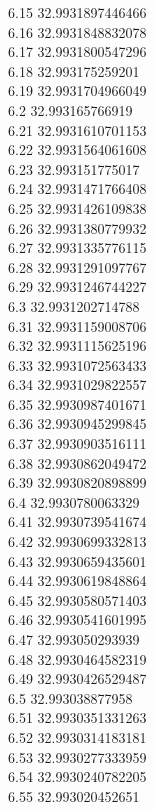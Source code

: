 {6.15	32.9931897446466\\
6.16	32.9931848832078\\
6.17	32.9931800547296\\
6.18	32.993175259201\\
6.19	32.9931704966049\\
6.2	32.993165766919\\
6.21	32.9931610701153\\
6.22	32.9931564061608\\
6.23	32.993151775017\\
6.24	32.9931471766408\\
6.25	32.9931426109838\\
6.26	32.9931380779932\\
6.27	32.9931335776115\\
6.28	32.9931291097767\\
6.29	32.9931246744227\\
6.3	32.9931202714788\\
6.31	32.9931159008706\\
6.32	32.9931115625196\\
6.33	32.9931072563433\\
6.34	32.9931029822557\\
6.35	32.9930987401671\\
6.36	32.9930945299845\\
6.37	32.9930903516111\\
6.38	32.9930862049472\\
6.39	32.9930820898899\\
6.4	32.9930780063329\\
6.41	32.9930739541674\\
6.42	32.9930699332813\\
6.43	32.9930659435601\\
6.44	32.9930619848864\\
6.45	32.9930580571403\\
6.46	32.9930541601995\\
6.47	32.993050293939\\
6.48	32.9930464582319\\
6.49	32.9930426529487\\
6.5	32.993038877958\\
6.51	32.9930351331263\\
6.52	32.9930314183181\\
6.53	32.9930277333959\\
6.54	32.9930240782205\\
6.55	32.993020452651\\
}
